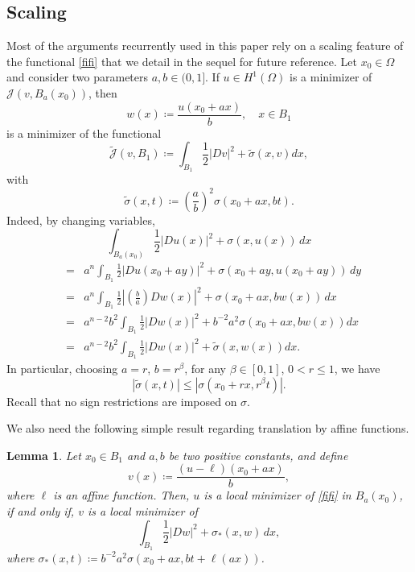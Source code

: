\documentclass[reqno,11pt]{amsart}
\newtheorem{lemma}{Lemma}[section]
\newcommand{\1}{\mathds{1}}  %
\numberwithin{equation}{section}
\begin{document}
\subsection{Scaling}\label{scaling of functional}

Most of the arguments recurrently used in this paper rely on a scaling feature of the functional \eqref{fifi} that we detail in the sequel for future reference. Let $x_0 \in \Omega$ and consider two parameters $a,b \in (0,1]$. If $u\in H^1(\Omega)$ is a minimizer of $\mathcal{J}(v,B_a(x_0))$, then
\begin{equation}\label{august}
    w(x) \coloneqq \frac{u(x_0 + ax)}{b}, \quad x\in B_1
\end{equation}
is a minimizer of the functional
$$
    \tilde{\mathcal{J}}(v,B_1) \coloneqq \int_{B_1} \frac{1}{2} \left| Dv \right|^2 + \tilde{\sigma}(x,v) dx,
$$
with
$$
    \tilde{\sigma}(x,t) \coloneqq \left(\frac{a}{b} \right)^2  \sigma(x_0 + ax,bt).
$$   
Indeed, by changing variables,
$$
    \int_{B_a(x_0)} \frac{1}{2} \left| Du (x)\right|^2 + \sigma(x,u(x))\,dx  
$$
\begin{eqnarray*}
 &= &  a^{n} \int_{B_1} \frac{1}{2} \left| Du(x_0 + ay) \right|^2 + \sigma(x_0 + ay,u(x_0 + ay))\,dy\\
 &   = &  a^n \int_{B_1} \frac{1}{2} \left| \left(\frac{b}{a} \right) Dw (x) \right|^2 + \sigma(x_0 + ax, b w(x))\,dx \\
 &   = & a^{n-2}b^2 \int_{B_1} \frac{1}{2} \left|Dw (x) \right|^2 + b^{-2}a^2  \sigma(x_0 + ax, b w(x)) dx \\
 &   = & a^{n-2}b^2 \int_{B_1} \frac{1}{2} \left| Dw (x) \right|^2 + \tilde{\sigma}(x,w(x))dx.
\end{eqnarray*}
In particular, choosing $a=r$, $b=r^\beta$, for any $\beta \in [0,1]$, $0<r\leq 1$, we have 
$$
    \left|\tilde{\sigma}(x,t)\right| \leq \left|\sigma \left( x_0 + rx, r^\beta t \right) \right|.
$$
Recall that no sign restrictions are imposed on $\sigma$. 

We also need the following simple result regarding translation by affine functions.

\begin{lemma}\label{equation for rescaled function}
Let $x_0 \in B_1$ and $a,b$ be two positive constants, and define
$$
    v(x) \coloneqq \frac{(u-\ell)(x_0 + ax)}{b},
$$
where $\ell$ is an affine function. Then, $u$ is a local minimizer of \eqref{fifi} in $B_a(x_0)$, if and only if, $v$ is a local minimizer of
$$
    \int_{B_1} \frac{1}{2}|Dw|^2 + \sigma_{\ast}(x,w)\,dx,
$$
where $\sigma_{\ast}(x,t) \coloneqq b^{-2}a^{2}\sigma\left(x_0 + ax, bt + \ell(ax)\right)$.
\end{lemma}
\end{document}
